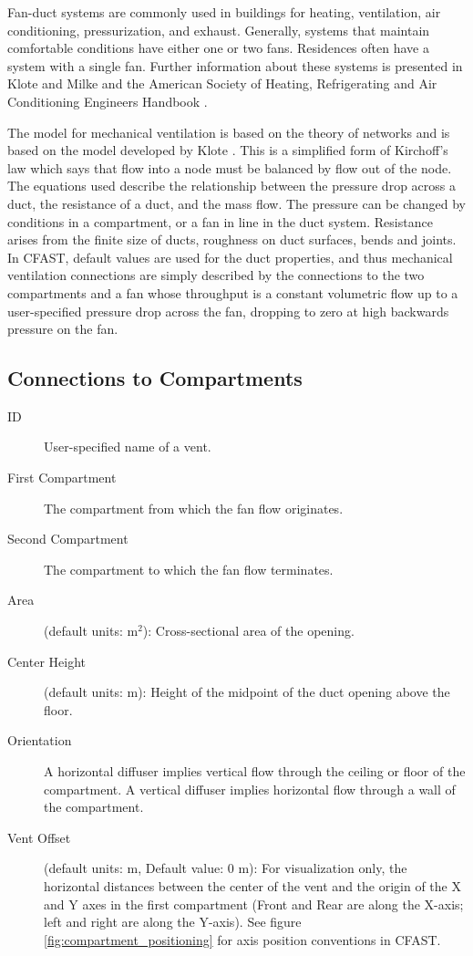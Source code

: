 Fan-duct systems are commonly used in buildings for heating, ventilation, air conditioning, pressurization, and exhaust. Generally, systems that maintain comfortable conditions have either one or two fans.  Residences often have a system with a single fan. Further information about these systems is presented in  Klote and Milke \cite{Klote:2002} and the American Society of Heating, Refrigerating and Air Conditioning Engineers Handbook \cite{ASHRAE:2001}.

The model for mechanical ventilation is based on the theory of networks and is based on the model developed by Klote \cite{Klote:1988a}.  This is a simplified form of Kirchoff's law which says that flow into a node must be balanced by flow out of the node. The equations used describe the relationship between the pressure drop across a duct, the resistance of a duct, and the mass flow.  The pressure can be changed by conditions in a compartment, or a fan in line in the duct system.  Resistance arises from the finite size of ducts, roughness on duct surfaces, bends and joints. In CFAST, default values are used for the duct properties, and thus mechanical ventilation connections are simply described by the connections to the two compartments and a fan whose throughput is a constant volumetric flow up to a user-specified pressure drop across the fan, dropping to zero at high backwards pressure on the fan.

\subsection{Connections to Compartments}
\label{info:VENT3}
\begin{description}
\item[ID] User-specified name of a vent.
\item[First Compartment] The compartment from which the fan flow originates.
\item[Second Compartment] The compartment to which the fan flow terminates.
\item[Area] (default units: m$^2$): Cross-sectional area of the opening.
\label{Mech Height}
\item[Center Height] (default units: m): Height of the midpoint of the duct opening above the floor.
\item[Orientation] A horizontal diffuser implies vertical flow through the ceiling or floor of the compartment.  A vertical diffuser implies horizontal flow through a wall of the compartment.
\item[Vent Offset] (default units: m, Default value: 0 m): For visualization only, the horizontal distances between the center of the vent and the origin of the X and Y axes in the first compartment (Front and Rear are along the X-axis; left and right are along the Y-axis). See figure \ref{fig:compartment_positioning} for axis position conventions in CFAST.
\end{description}

